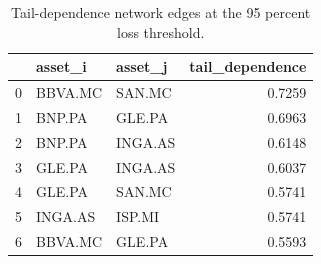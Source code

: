 \begin{table}
\caption{Tail-dependence network edges at the 95 percent loss threshold.}
\label{tab:tail_dependence_network_edges_q95}
\begin{tabular}{lllr}
\toprule
 & asset_i & asset_j & tail_dependence \\
\midrule
0 & BBVA.MC & SAN.MC & 0.7259 \\
1 & BNP.PA & GLE.PA & 0.6963 \\
2 & BNP.PA & INGA.AS & 0.6148 \\
3 & GLE.PA & INGA.AS & 0.6037 \\
4 & GLE.PA & SAN.MC & 0.5741 \\
5 & INGA.AS & ISP.MI & 0.5741 \\
6 & BBVA.MC & GLE.PA & 0.5593 \\
\bottomrule
\end{tabular}
\end{table}

